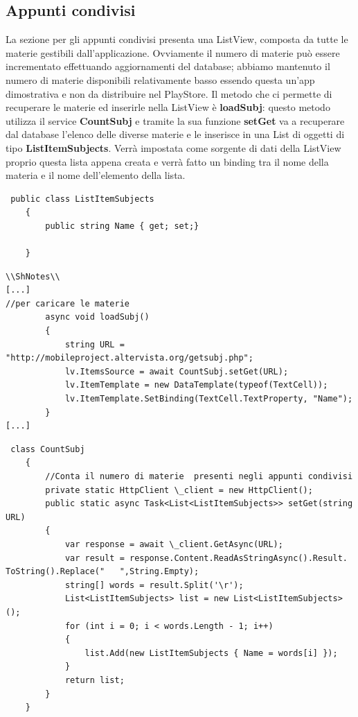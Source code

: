 \documentclass[a4paper, 50pt, twoside]{article}
\begin{document}
\subsection{Appunti condivisi}
La sezione per gli appunti condivisi presenta una ListView, composta da tutte le materie gestibili dall'applicazione. Ovviamente il numero di materie può essere incrementato effettuando aggiornamenti del database; abbiamo mantenuto il numero di materie disponibili relativamente basso essendo questa un'app dimostrativa e non da distribuire nel PlayStore. Il metodo che ci permette di recuperare le materie ed inserirle nella ListView è \textbf{loadSubj}: questo metodo utilizza il service \textbf{CountSubj} e tramite la sua funzione \textbf{setGet} va a recuperare dal database l'elenco delle diverse materie e le inserisce in una List di oggetti di tipo \textbf{ListItemSubjects}. Verrà impostata come sorgente di dati della ListView proprio questa lista appena creata e verrà fatto un binding tra il nome della materia e il nome dell'elemento della lista. 
\begin{lstlisting}
 public class ListItemSubjects
    {
        public string Name { get; set;}

    }
\end{lstlisting}
\begin{lstlisting}
\\ShNotes\\
[...]
//per caricare le materie
        async void loadSubj()
        {
            string URL = "http://mobileproject.altervista.org/getsubj.php";
            lv.ItemsSource = await CountSubj.setGet(URL);
            lv.ItemTemplate = new DataTemplate(typeof(TextCell));
            lv.ItemTemplate.SetBinding(TextCell.TextProperty, "Name");
        }
[...]
\end{lstlisting}
\begin{lstlisting}
 class CountSubj
    {
        //Conta il numero di materie  presenti negli appunti condivisi
        private static HttpClient \_client = new HttpClient();
        public static async Task<List<ListItemSubjects>> setGet(string URL)
        {
            var response = await \_client.GetAsync(URL);
            var result = response.Content.ReadAsStringAsync().Result.
ToString().Replace("   ",String.Empty);
            string[] words = result.Split('\r');
            List<ListItemSubjects> list = new List<ListItemSubjects>();
            for (int i = 0; i < words.Length - 1; i++)
            {
                list.Add(new ListItemSubjects { Name = words[i] });
            }
            return list;
        }
    }
\end{lstlisting}
\end{document}
